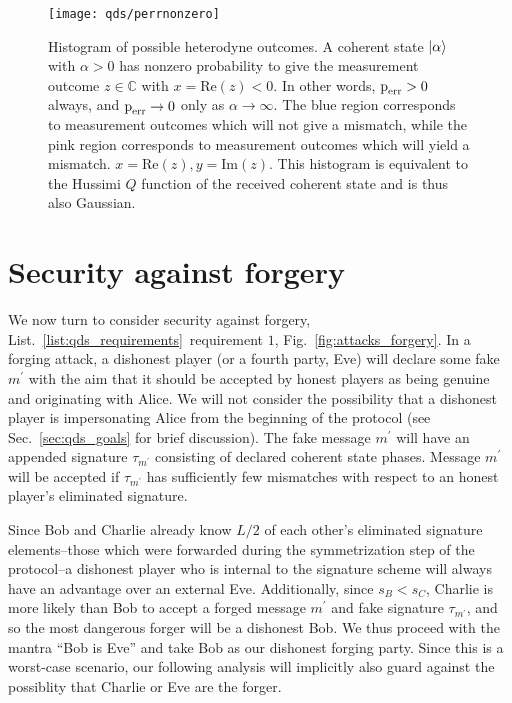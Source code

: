 \begin{figure}[htp]
\centering
\texttt{[image: qds/perrnonzero]}
\caption{\label{fig:perr} Histogram of possible heterodyne outcomes. A coherent state $\ket{\alpha}$ with $\alpha>0$ has nonzero probability to give the measurement outcome $z \in \mathbb{C}$ with $x = \text{Re}\left(z\right) < 0$. In other words, $\text{p}_{\text{err}} > 0$ always, and $\text{p}_{\text{err}} \rightarrow 0$ only as $\alpha \rightarrow \infty$. The blue region corresponds to measurement outcomes which will not give a mismatch, while the pink region corresponds to measurement outcomes which will yield a mismatch. $x = \text{Re}\left(z\right), y = \text{Im}\left(z\right)$. This histogram is equivalent to the Hussimi $Q$ function \cite{Leonhardt2010} of the received coherent state and is thus also Gaussian.}
\end{figure}


\section{Security against forgery}\label{sec:qds_security_forgery}
We now turn to consider security against forgery, List.~\ref{list:qds_requirements}~requirement $1$, Fig.~\ref{fig:attacks_forgery}. In a forging attack, a dishonest player (or a fourth party, Eve) will declare some fake $m^\prime$ with the aim that it should be accepted by honest players as being genuine and originating with Alice. %
We will not consider the possibility that a dishonest player is impersonating Alice from the beginning of the protocol (see Sec.~\ref{sec:qds_goals} for brief discussion). The fake message $m^\prime$ will have an appended signature $\tau_{m^\prime}$ consisting of declared coherent state phases. Message $m^\prime$ will be accepted if $\tau_{m^\prime}$ has sufficiently few mismatches with respect to an honest player's eliminated signature. 


Since Bob and Charlie already know $L/2$ of each other's eliminated signature elements--those which were forwarded during the symmetrization step of the protocol--a dishonest player who is internal to the signature scheme will always have an advantage over an external Eve. Additionally, since $s_B < s_C$, Charlie is more likely than Bob to accept a forged message $m^\prime$ and fake signature $\tau_{m^\prime}$, and so the most dangerous forger will be a dishonest Bob. We thus proceed with the mantra ``Bob is Eve'' and take Bob as our dishonest forging party. Since this is a worst-case scenario, our following analysis will implicitly also guard against the possiblity that Charlie or Eve are the forger.

